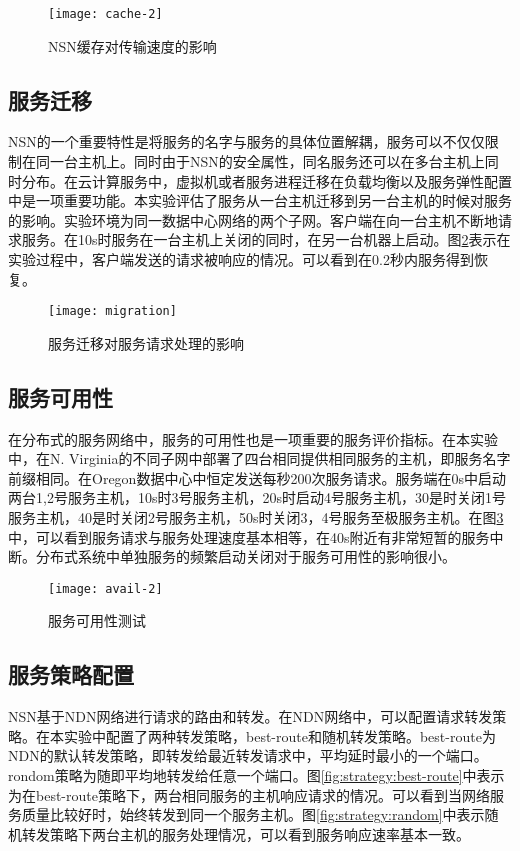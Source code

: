 \begin{figure}[H]
  \centering
  \texttt{[image: cache-2]}
  \caption{NSN缓存对传输速度的影响}
  \label{fig:cache-2}
\end{figure}

\subsection{服务迁移}
NSN的一个重要特性是将服务的名字与服务的具体位置解耦，服务可以不仅仅限制在同一台主机上。同时由于NSN的安全属性，同名服务还可以在多台主机上同时分布。在云计算服务中，虚拟机或者服务进程迁移在负载均衡以及服务弹性配置中是一项重要功能。本实验评估了服务从一台主机迁移到另一台主机的时候对服务的影响。实验环境为同一数据中心网络的两个子网。客户端在向一台主机不断地请求服务。在10s时服务在一台主机上关闭的同时，在另一台机器上启动。图\ref{fig:migration}表示在实验过程中，客户端发送的请求被响应的情况。可以看到在0.2秒内服务得到恢复。

\begin{figure}[H]
  \centering
  \texttt{[image: migration]}
  \caption{服务迁移对服务请求处理的影响}
  \label{fig:migration}
\end{figure}

\subsection{服务可用性}
在分布式的服务网络中，服务的可用性也是一项重要的服务评价指标。在本实验中，在N. Virginia的不同子网中部署了四台相同提供相同服务的主机，即服务名字前缀相同。在Oregon数据中心中恒定发送每秒200次服务请求。服务端在0s中启动两台1,2号服务主机，10s时3号服务主机，20s时启动4号服务主机，30是时关闭1号服务主机，40是时关闭2号服务主机，50s时关闭3，4号服务至极服务主机。在图\ref{fig:avail-2}中，可以看到服务请求与服务处理速度基本相等，在40s附近有非常短暂的服务中断。分布式系统中单独服务的频繁启动关闭对于服务可用性的影响很小。

\begin{figure}[H]
  \centering
  \texttt{[image: avail-2]}
  \caption{服务可用性测试}
  \label{fig:avail-2}
\end{figure}

\subsection{服务策略配置}
NSN基于NDN网络进行请求的路由和转发。在NDN网络中，可以配置请求转发策略。在本实验中配置了两种转发策略，best-route和随机转发策略。best-route为NDN的默认转发策略，即转发给最近转发请求中，平均延时最小的一个端口。rondom策略为随即平均地转发给任意一个端口。图\ref{fig:strategy:best-route}中表示为在best-route策略下，两台相同服务的主机响应请求的情况。可以看到当网络服务质量比较好时，始终转发到同一个服务主机。图\ref{fig:strategy:random}中表示随机转发策略下两台主机的服务处理情况，可以看到服务响应速率基本一致。

